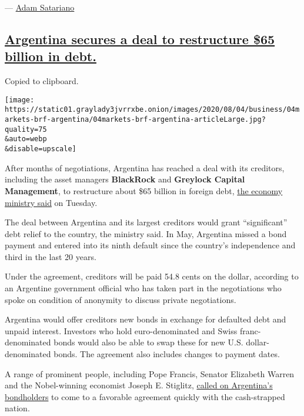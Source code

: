 --- \href{https://www.nytimes3xbfgragh.onion/by/adam-satariano}{Adam
Satariano}

\hypertarget{argentina-secures-a-deal-to-restructure-65-billion-in-debt}{%
\subsection{\texorpdfstring{\protect\hyperlink{argentina-secures-a-deal-to-restructure-65-billion-in-debt}{Argentina
secures a deal to restructure \$65 billion in
debt.}}{Argentina secures a deal to restructure \$65 billion in debt.}}\label{argentina-secures-a-deal-to-restructure-65-billion-in-debt}}

Copied to clipboard.

\texttt{[image: https://static01.graylady3jvrrxbe.onion/images/2020/08/04/business/04markets-brf-argentina/04markets-brf-argentina-articleLarge.jpg?quality=75\\\&auto=webp\\\&disable=upscale]}

After months of negotiations, Argentina has reached a deal with its
creditors, including the asset managers \textbf{BlackRock} and
\textbf{Greylock Capital Management}, to restructure about \$65 billion
in foreign debt,
\href{https://www.economia.gob.ar/en/argentina-and-three-creditor-groups-reach-a-deal-on-debt-restructuring/}{the
economy ministry said} on Tuesday.

The deal between Argentina and its largest creditors would grant
``significant'' debt relief to the country, the ministry said. In May,
Argentina missed a bond payment and entered into its ninth default since
the country's independence and third in the last 20 years.

Under the agreement, creditors will be paid 54.8 cents on the dollar,
according to an Argentine government official who has taken part in the
negotiations who spoke on condition of anonymity to discuss private
negotiations.

Argentina would offer creditors new bonds in exchange for defaulted debt
and unpaid interest. Investors who hold euro-denominated and Swiss
franc-denominated bonds would also be able to swap these for new U.S.
dollar-denominated bonds. The agreement also includes changes to payment
dates.

A range of prominent people, including Pope Francis, Senator Elizabeth
Warren and the Nobel-winning economist Joseph E. Stiglitz,
\href{https://www.nytimes3xbfgragh.onion/2020/05/22/world/americas/argentina-default.html}{called
on Argentina's bondholders} to come to a favorable agreement quickly
with the cash-strapped nation.

